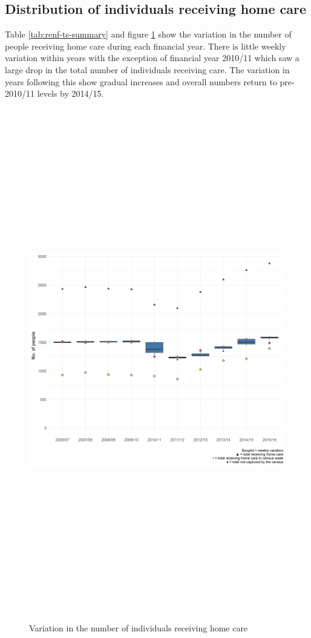 \documentclass[]{article}
\begin{document}
\FloatBarrier

\subsection{Distribution of individuals receiving home care}\label{renf-results-ts}

Table \ref{tab:renf-ts-summary} and figure \ref{fig:renf-hrs} show the
variation in the number of people receiving home care during each
financial year. There is little weekly variation within years with the
exception of financial year 2010/11 which saw a large drop in the total
number of individuals receiving care. The variation in years following
this show gradual increases and overall numbers return to pre-2010/11
levels by 2014/15.

\begin{figure}[h]
  \centering
    \caption{Variation in the number of individuals receiving home care}
    \includegraphics[width = 14cm, height = 22cm]{figures/chapter-renf/06-indivdual-weekly-variation.png}
    \label{fig:renf-hrs}
\end{figure}
\end{document}
